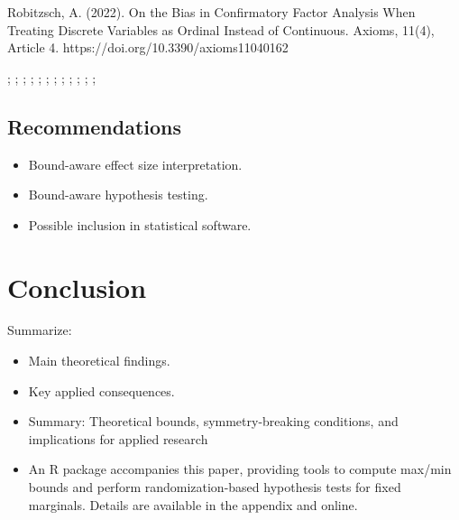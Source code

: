 \documentclass[
  12pt,
]{article}
\providecommand{\tightlist}{%
  \setlength{\itemsep}{0pt}\setlength{\parskip}{0pt}}
\theoremstyle{plain}
\theoremstyle{definition}
\theoremstyle{remark}
\begin{document}
Robitzsch, A. (2022). On the Bias in Confirmatory Factor Analysis When
Treating Discrete Variables as Ordinal Instead of Continuous. Axioms,
11(4), Article 4. https://doi.org/10.3390/axioms11040162

\textcite{frec51-tableaux}

\textcite{whit76-bivariate}

\textcite{hoef40-masstabinvariante}

\textcite{lehm66-concepts}

\textcite{tche80-inequalities}

\textcite{camb76-inequalities}

\textcite{shih92-evaluating}

\textcite{alwi91-reliability}; \textcite{brew05-values};
\textcite{flor04-empirical}; \textcite{gait80-measurement};
\textcite{gree97-effect}; \textcite{jaco99-levels};
\textcite{kend38-new}; \textcite{knok02-statistics};
\textcite{kreu07-survey}; \textcite{kros97-designing};
\textcite{labo70-assignment}; \textcite{olss79-maximum};
\textcite{spea04-proof}

\subsection{Recommendations}\label{recommendations}

\begin{itemize}
\tightlist
\item
  Bound-aware effect size interpretation.
\item
  Bound-aware hypothesis testing.
\item
  Possible inclusion in statistical software.
\end{itemize}

\section{Conclusion}\label{conclusion}

Summarize:

\begin{itemize}
\item
  Main theoretical findings.
\item
  Key applied consequences.
\item
  Summary: Theoretical bounds, symmetry-breaking conditions, and
  implications for applied research
\item
  An R package accompanies this paper, providing tools to compute
  max/min bounds and perform randomization-based hypothesis tests for
  fixed marginals. Details are available in the appendix and online.
\end{itemize}
\end{document}
